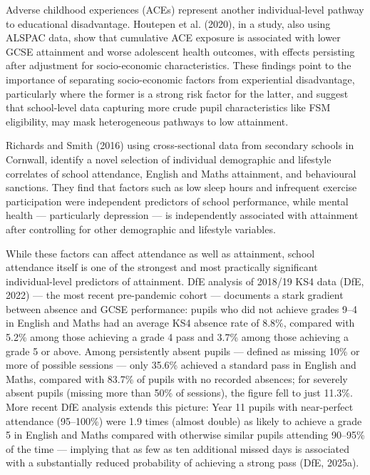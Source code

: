 \documentclass[
  11pt,
]{article}
\begin{document}
Adverse childhood experiences (ACEs) represent another individual-level
pathway to educational disadvantage. Houtepen et al. (2020), in a study,
also using ALSPAC data, show that cumulative ACE exposure is associated
with lower GCSE attainment and worse adolescent health outcomes, with
effects persisting after adjustment for socio-economic characteristics.
These findings point to the importance of separating socio-economic
factors from experiential disadvantage, particularly where the former is
a strong risk factor for the latter, and suggest that school-level data
capturing more crude pupil characteristics like FSM eligibility, may
mask heterogeneous pathways to low attainment.

Richards and Smith (2016) using cross-sectional data from secondary
schools in Cornwall, identify a novel selection of individual
demographic and lifestyle correlates of school attendance, English and
Maths attainment, and behavioural sanctions. They find that factors such
as low sleep hours and infrequent exercise participation were
independent predictors of school performance, while mental health ---
particularly depression --- is independently associated with attainment
after controlling for other demographic and lifestyle variables.

While these factors can affect attendance as well as attainment, school
attendance itself is one of the strongest and most practically
significant individual-level predictors of attainment. DfE analysis of
2018/19 KS4 data (DfE, 2022) --- the most recent pre-pandemic cohort ---
documents a stark gradient between absence and GCSE performance: pupils
who did not achieve grades 9--4 in English and Maths had an average KS4
absence rate of 8.8\%, compared with 5.2\% among those achieving a grade
4 pass and 3.7\% among those achieving a grade 5 or above. Among
persistently absent pupils --- defined as missing 10\% or more of
possible sessions --- only 35.6\% achieved a standard pass in English
and Maths, compared with 83.7\% of pupils with no recorded absences; for
severely absent pupils (missing more than 50\% of sessions), the figure
fell to just 11.3\%. More recent DfE analysis extends this picture: Year
11 pupils with near-perfect attendance (95--100\%) were 1.9 times
(almost double) as likely to achieve a grade 5 in English and Maths
compared with otherwise similar pupils attending 90--95\% of the time
--- implying that as few as ten additional missed days is associated
with a substantially reduced probability of achieving a strong pass
(DfE, 2025a).
\end{document}
